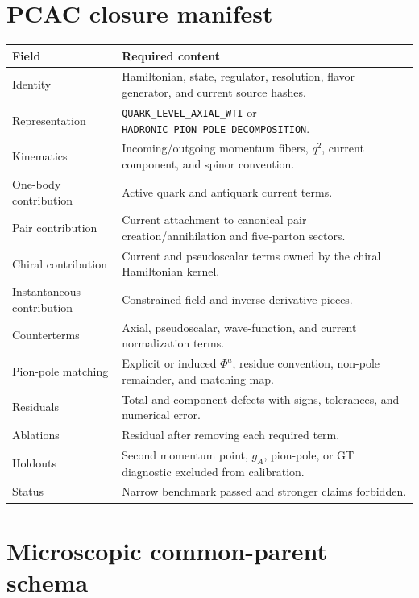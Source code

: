\documentclass[11pt]{article}
\begin{document}
\section{PCAC closure manifest}

\begin{longtable}{L{0.25\textwidth}L{0.67\textwidth}}
\toprule
Field & Required content\\
\midrule
\endhead
Identity & Hamiltonian, state, regulator, resolution, flavor generator, and
current source hashes.\\
Representation & \texttt{QUARK\_LEVEL\_AXIAL\_WTI} or
\texttt{HADRONIC\_PION\_POLE\_DECOMPOSITION}.\\
Kinematics & Incoming/outgoing momentum fibers, \(q^2\), current component,
and spinor convention.\\
One-body contribution & Active quark and antiquark current terms.\\
Pair contribution & Current attachment to canonical pair creation/annihilation
and five-parton sectors.\\
Chiral contribution & Current and pseudoscalar terms owned by the chiral
Hamiltonian kernel.\\
Instantaneous contribution & Constrained-field and inverse-derivative pieces.\\
Counterterms & Axial, pseudoscalar, wave-function, and current normalization
terms.\\
Pion-pole matching & Explicit or induced \(\Phi^a\), residue convention,
non-pole remainder, and matching map.\\
Residuals & Total and component defects with signs, tolerances, and numerical
error.\\
Ablations & Residual after removing each required term.\\
Holdouts & Second momentum point, \(g_A\), pion-pole, or GT diagnostic excluded
from calibration.\\
Status & Narrow benchmark passed and stronger claims forbidden.\\
\bottomrule
\end{longtable}

\section{Microscopic common-parent schema}
\end{document}
